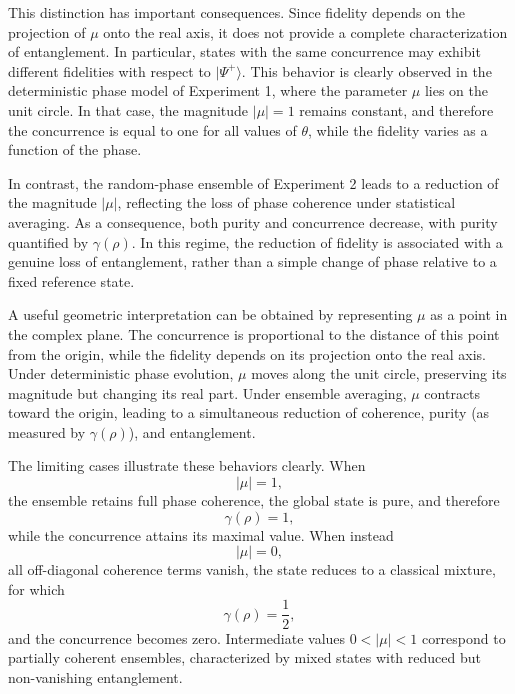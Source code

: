 \documentclass[a4paper]{article}
\begin{document}
\medskip

This distinction has important consequences. Since fidelity depends on the projection of \(\mu\) onto the real axis, it does not provide a complete characterization of entanglement. In particular, states with the same concurrence may exhibit different fidelities with respect to \( |\Psi^+\rangle \). This behavior is clearly observed in the deterministic phase model of Experiment 1, where the parameter \(\mu\) lies on the unit circle. In that case, the magnitude \( |\mu| = 1 \) remains constant, and therefore the concurrence is equal to one for all values of \(\theta\), while the fidelity varies as a function of the phase.

\medskip

In contrast, the random-phase ensemble of Experiment 2 leads to a reduction of the magnitude \( |\mu| \), reflecting the loss of phase coherence under statistical averaging. As a consequence, both purity and concurrence decrease, with purity quantified by \(\gamma(\rho)\). In this regime, the reduction of fidelity is associated with a genuine loss of entanglement, rather than a simple change of phase relative to a fixed reference state.

\medskip

A useful geometric interpretation can be obtained by representing \(\mu\) as a point in the complex plane. The concurrence is proportional to the distance of this point from the origin, while the fidelity depends on its projection onto the real axis. Under deterministic phase evolution, \(\mu\) moves along the unit circle, preserving its magnitude but changing its real part. Under ensemble averaging, \(\mu\) contracts toward the origin, leading to a simultaneous reduction of coherence, purity (as measured by \(\gamma(\rho)\)), and entanglement.

\medskip

The limiting cases illustrate these behaviors clearly. When
\[
|\mu| = 1,
\]
the ensemble retains full phase coherence, the global state is pure, and therefore
\[
\gamma(\rho) = 1,
\]
while the concurrence attains its maximal value. When instead
\[
|\mu| = 0,
\]
all off-diagonal coherence terms vanish, the state reduces to a classical mixture, for which
\[
\gamma(\rho) = \frac{1}{2},
\]
and the concurrence becomes zero. Intermediate values \(0 < |\mu| < 1\) correspond to partially coherent ensembles, characterized by mixed states with reduced but non-vanishing entanglement.

\medskip
\end{document}

